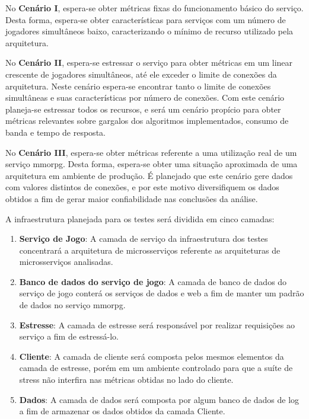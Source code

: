 No \textbf{Cenário I}, espera-se obter métricas fixas do funcionamento básico do serviço.
%
Desta forma, espera-se obter características para serviços com um número de jogadores simultâneos baixo, caracterizando o mínimo de recurso utilizado pela arquitetura.



No \textbf{Cenário II}, espera-se estressar o serviço para obter métricas em um linear crescente de jogadores simultâneos, até ele exceder o limite de conexões da arquitetura.
%
Neste cenário espera-se encontrar tanto o limite de conexões simultâneas e suas características por número de conexões.
%
Com este cenário planeja-se estressar todos os recursos, e será um cenário propício para obter métricas relevantes sobre gargalos dos algoritmos implementados, consumo de banda e tempo de resposta.



No \textbf{Cenário III}, espera-se obter métricas referente a uma utilização real de um serviço \ac{mmorpg}.
%
Desta forma, espera-se obter uma situação aproximada de uma arquitetura em ambiente de produção.
%
É planejado que este cenário gere dados com valores distintos de conexões, e por este motivo diversifiquem os dados obtidos a fim de gerar maior confiabilidade nas conclusões da análise.


A infraestrutura planejada para os testes será dividida em cinco camadas:
\begin{enumerate}
  \item \textbf{Serviço de Jogo}: A camada de serviço da infraestrutura dos testes concentrará a arquitetura de microsserviços referente as arquiteturas de microsserviços analisadas.
  \item \textbf{Banco de dados do serviço de jogo}: A camada de banco de dados do serviço de jogo conterá os serviços de dados e web a fim de manter um padrão de dados no serviço \ac{mmorpg}.
  \item \textbf{Estresse}: A camada de estresse será responsável por realizar requisições ao serviço a fim de estressá-lo.
  \item \textbf{Cliente}: A camada de cliente será composta pelos mesmos elementos da camada de estresse, porém em um ambiente controlado para que a suíte de stress não interfira nas métricas obtidas no lado do cliente.
  \item \textbf{Dados}: A camada de dados será composta por algum banco de dados de log a fim de armazenar os dados obtidos da camada Cliente.
\end{enumerate}


